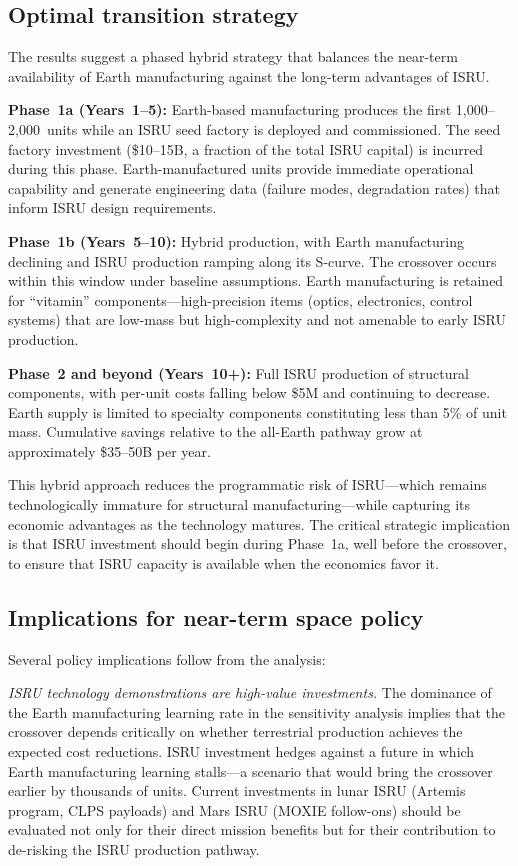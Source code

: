 \documentclass[preprint,12pt]{elsarticle}
\begin{document}
\subsection{Optimal transition strategy}

The results suggest a phased hybrid strategy that balances the near-term availability of Earth manufacturing against the long-term advantages of ISRU.

\textbf{Phase~1a (Years~1--5):} Earth-based manufacturing produces the first 1{,}000--2{,}000~units while an ISRU seed factory is deployed and commissioned. The seed factory investment (\$10--15B, a fraction of the total ISRU capital) is incurred during this phase. Earth-manufactured units provide immediate operational capability and generate engineering data (failure modes, degradation rates) that inform ISRU design requirements.

\textbf{Phase~1b (Years~5--10):} Hybrid production, with Earth manufacturing declining and ISRU production ramping along its S-curve. The crossover occurs within this window under baseline assumptions. Earth manufacturing is retained for ``vitamin'' components---high-precision items (optics, electronics, control systems) that are low-mass but high-complexity and not amenable to early ISRU production.

\textbf{Phase~2 and beyond (Years~10+):} Full ISRU production of structural components, with per-unit costs falling below \$5M and continuing to decrease. Earth supply is limited to specialty components constituting less than 5\% of unit mass. Cumulative savings relative to the all-Earth pathway grow at approximately \$35--50B per year.

This hybrid approach reduces the programmatic risk of ISRU---which remains technologically immature for structural manufacturing---while capturing its economic advantages as the technology matures. The critical strategic implication is that ISRU investment should begin during Phase~1a, well before the crossover, to ensure that ISRU capacity is available when the economics favor it.

\subsection{Implications for near-term space policy}

Several policy implications follow from the analysis:

\emph{ISRU technology demonstrations are high-value investments.} The dominance of the Earth manufacturing learning rate in the sensitivity analysis implies that the crossover depends critically on whether terrestrial production achieves the expected cost reductions. ISRU investment hedges against a future in which Earth manufacturing learning stalls---a scenario that would bring the crossover earlier by thousands of units. Current investments in lunar ISRU (Artemis program, CLPS payloads) and Mars ISRU (MOXIE follow-ons) should be evaluated not only for their direct mission benefits but for their contribution to de-risking the ISRU production pathway.
\end{document}
